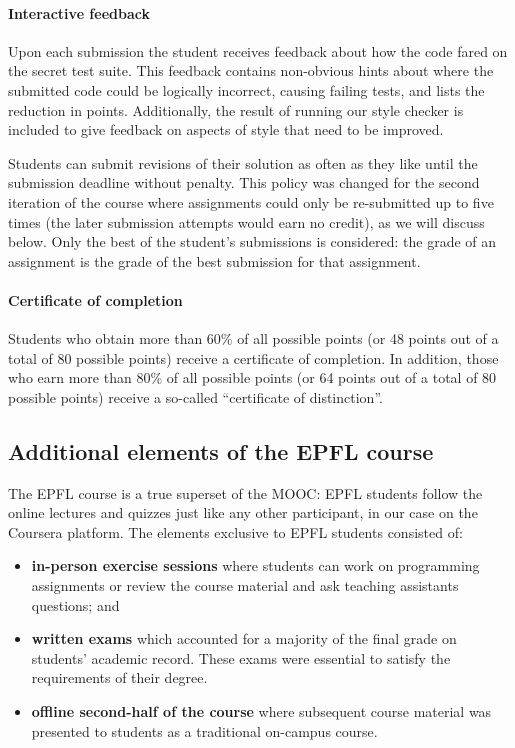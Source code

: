 \documentclass{sig-alternate}
\begin{document}
\paragraph{Interactive feedback}

Upon each submission the student receives feedback about how the code fared on
the secret test suite. This feedback contains non-obvious hints about where the submitted code could be logically incorrect, causing failing tests, and
lists the reduction in points. Additionally, the result of
running our style checker is included to give feedback on aspects of style
that need to be improved.

Students can submit revisions of their solution as often
as they like until the submission deadline without penalty. This policy was
changed for the second iteration of the course where assignments could only be
re-submitted up to five times (the later submission attempts would
earn no credit), as we will discuss below. Only the best of the student's submissions is considered:
the grade of an assignment is the grade of the best submission for that
assignment.

\paragraph{Certificate of completion} Students who obtain more than 60\% of
all possible points (or 48 points out of a total of 80 possible points) receive a certificate of completion. In addition, those
who earn more than 80\% of all possible points (or 64 points out of a total of 80 possible points) receive a so-called
``certificate of distinction''.

\subsection{Additional elements of the EPFL course}

The EPFL course is a true superset of the MOOC: EPFL students follow the
online lectures and quizzes just like any other participant, in our
case on the Coursera platform. The elements exclusive to EPFL students
consisted of:

\begin{itemize}
\item {\bf in-person exercise sessions} where students can work on programming assignments or review the course material and ask teaching assistants questions; and
\item {\bf written exams} which accounted for a majority of the final grade on students'  academic record. These exams were essential to satisfy the requirements of
  their degree.
\item {\bf offline second-half of the course} where subsequent course material was presented to students as a traditional on-campus course.
\end{itemize}
\end{document}
